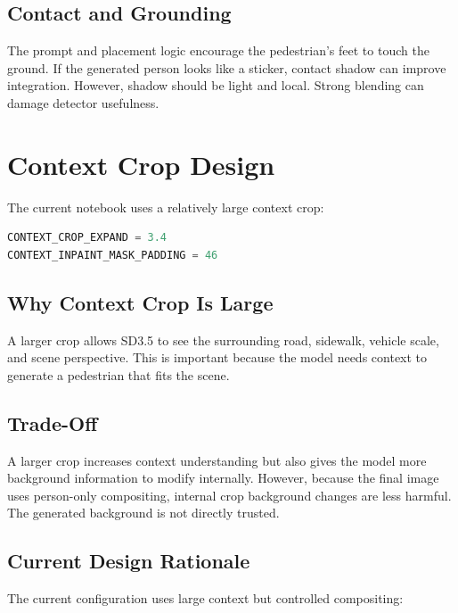 \documentclass[12pt,a4paper]{article}
\begin{document}
\subsection{Contact and Grounding}

The prompt and placement logic encourage the pedestrian's feet to touch the
ground. If the generated person looks like a sticker, contact shadow can improve
integration. However, shadow should be light and local. Strong blending can
damage detector usefulness.

\section{Context Crop Design}

The current notebook uses a relatively large context crop:

\begin{lstlisting}[language=Python,caption={Current context crop settings}]
CONTEXT_CROP_EXPAND = 3.4
CONTEXT_INPAINT_MASK_PADDING = 46
\end{lstlisting}

\subsection{Why Context Crop Is Large}

A larger crop allows SD3.5 to see the surrounding road, sidewalk, vehicle scale,
and scene perspective. This is important because the model needs context to
generate a pedestrian that fits the scene.

\subsection{Trade-Off}

A larger crop increases context understanding but also gives the model more
background information to modify internally. However, because the final image
uses person-only compositing, internal crop background changes are less harmful.
The generated background is not directly trusted.

\subsection{Current Design Rationale}

The current configuration uses large context but controlled compositing:
\end{document}
